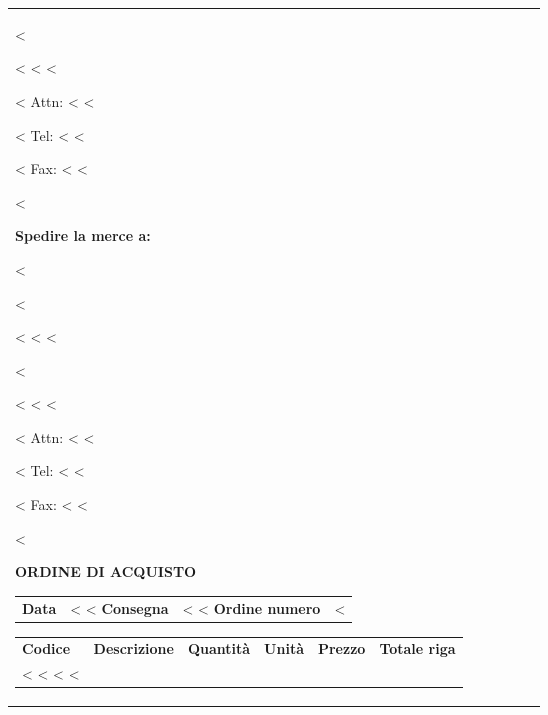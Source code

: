 \documentclass[twoside]{scrartcl}
\begin{document}
{{{\begin{tabular*}{\textwidth}{@{}lp{\descrwidth}@{\extracolsep\fill}rlrr@{}}
{<%

<%
<%
<%

\vspace{0.3cm}

<%
Attn: <%
\vspace{0.3cm}
<%

<%
Tel: <%
<%

<%
Fax: <%
<%

<%
}
\parbox[t]{7.5cm}{
\textbf{Spedire la merce a:}
\vspace{0.3cm}

<%

<%

<%
<%
<%

<%

<%
<%
<%

\vspace{0.3cm}

<%
Attn: <%
\vspace{0.3cm}
<%

<%
Tel: <%
<%

<%
Fax: <%
<%

<%
}
\hfill

\vspace{1cm}

\textbf{ORDINE DI ACQUISTO}
\hfill
\begin{tabular}[t]{l@{\hspace{0.3cm}}l}
  \textbf{Data} & <%
<%
  \textbf{Consegna} & <%
<%
  \textbf{Ordine numero} & <%
\end{tabular}

\vspace{1cm}

\begin{tabular*}{\textwidth}{@{}lp{\descrwidth}@{\extracolsep\fill}rlrr@{}}
  \textbf{Codice} & \textbf{Descrizione} & \textbf{Quantit\`a} &
    \textbf{Unit\`a} & \textbf{Prezzo} & \textbf{Totale riga} \\
<%
  <%
    <%
<%
\end{tabular*}



\end{tabular*}}}}
\end{document}
